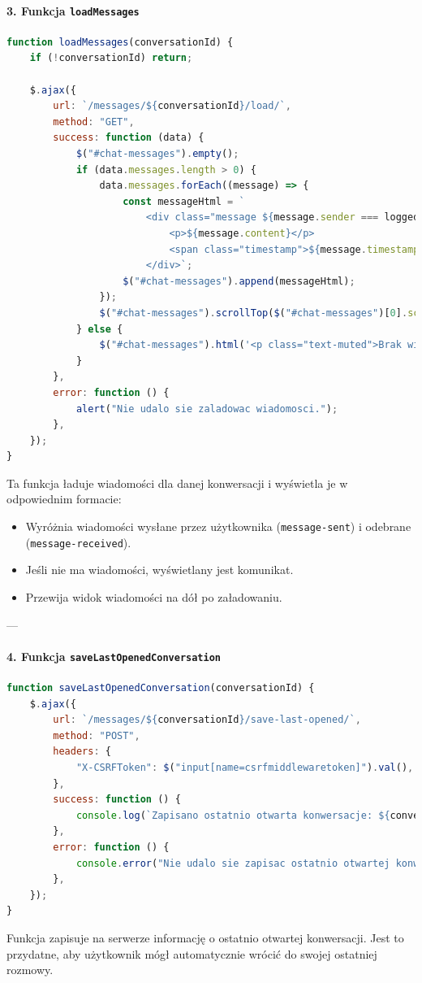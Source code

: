 \documentclass[12pt,a4paper,oneside]{article}
\theoremstyle{definition}
\numberwithin{equation}{section}
\begin{document}
\paragraph{3. Funkcja \texttt{loadMessages}}
\begin{lstlisting}[language=JavaScript, caption=Funkcja \texttt{loadMessages}]
function loadMessages(conversationId) {
    if (!conversationId) return;

    $.ajax({
        url: `/messages/${conversationId}/load/`,
        method: "GET",
        success: function (data) {
            $("#chat-messages").empty();
            if (data.messages.length > 0) {
                data.messages.forEach((message) => {
                    const messageHtml = `
                        <div class="message ${message.sender === loggedInUser ? "message-sent" : "message-received"}">
                            <p>${message.content}</p>
                            <span class="timestamp">${message.timestamp}</span>
                        </div>`;
                    $("#chat-messages").append(messageHtml);
                });
                $("#chat-messages").scrollTop($("#chat-messages")[0].scrollHeight);
            } else {
                $("#chat-messages").html('<p class="text-muted">Brak wiadomosci w tej konwersacji.</p>');
            }
        },
        error: function () {
            alert("Nie udalo sie zaladowac wiadomosci.");
        },
    });
}
\end{lstlisting}
Ta funkcja ładuje wiadomości dla danej konwersacji i wyświetla je w odpowiednim formacie:
\begin{itemize}
    \item Wyróżnia wiadomości wysłane przez użytkownika (\texttt{message-sent}) i odebrane (\texttt{message-received}).
    \item Jeśli nie ma wiadomości, wyświetlany jest komunikat.
    \item Przewija widok wiadomości na dół po załadowaniu.
\end{itemize}

---

\paragraph{4. Funkcja \texttt{saveLastOpenedConversation}}
\begin{lstlisting}[language=JavaScript, caption=Funkcja \texttt{saveLastOpenedConversation}]
function saveLastOpenedConversation(conversationId) {
    $.ajax({
        url: `/messages/${conversationId}/save-last-opened/`,
        method: "POST",
        headers: {
            "X-CSRFToken": $("input[name=csrfmiddlewaretoken]").val(),
        },
        success: function () {
            console.log(`Zapisano ostatnio otwarta konwersacje: ${conversationId}`);
        },
        error: function () {
            console.error("Nie udalo sie zapisac ostatnio otwartej konwersacji.");
        },
    });
}
\end{lstlisting}
Funkcja zapisuje na serwerze informację o ostatnio otwartej konwersacji. Jest to przydatne, aby użytkownik mógł automatycznie wrócić do swojej ostatniej rozmowy.
\end{document}
